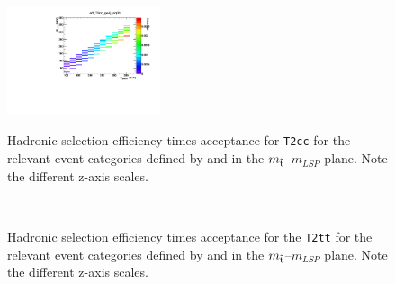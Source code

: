 \begin{figure}[h!]
\begin{center}
{      \includegraphics[width=0.4\textwidth,page=2]{figures/sms/t2cc/v1/T2cc_eff}
    } 
    \caption{Hadronic selection efficiency times acceptance for \texttt{T2cc}
      for the relevant event categories defined by \njet and \nb in the $m_{\tilde{\rm t}}$--$m_{LSP}$ plane.
      Note the different z-axis scales.}
    \label{fig:sms-eff-t2cc}
  \end{center}
\end{figure}

\begin{figure}[!h]
  \begin{center}
     \\
    \caption{Hadronic selection efficiency times acceptance for the \texttt{T2tt}
      for the relevant event categories defined by \njet and \nb in the $m_{\tilde{\rm t}}$--$m_{LSP}$ plane.
       Note the different z-axis scales.}
    \label{fig:sms-eff-t2tt}
  \end{center}
\end{figure}

